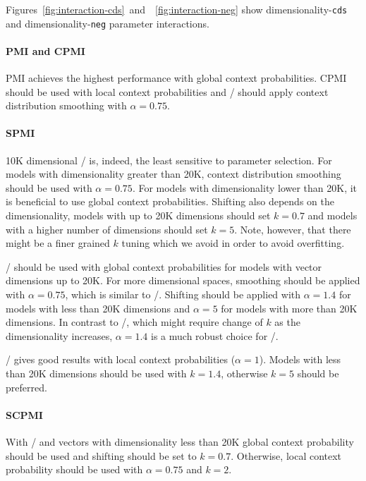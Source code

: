 \documentclass[11pt,letterpaper]{article}
\begin{document}


Figures~\ref{fig:interaction-cds}~and~~\ref{fig:interaction-neg} show dimensionality-\texttt{cds} and dimensionality-\texttt{neg} parameter interactions.

\paragraph{PMI and CPMI}

PMI achieves the highest performance with global context probabilities. CPMI should be used with local context probabilities and \CPMI/ should apply context distribution smoothing with $\alpha = 0.75$.

\paragraph{SPMI}

10K dimensional \SPMI/ is, indeed, the least sensitive to parameter selection. For models with dimensionality greater than 20K, context distribution smoothing should be used with $\alpha = 0.75$. For models with dimensionality lower than 20K, it is beneficial to use global context probabilities. Shifting also depends on the dimensionality, models with up to 20K dimensions should set $k = 0.7$ and models with a higher number of dimensions should set $k = 5$. Note, however, that there might be a finer grained $k$ tuning which we avoid in order to avoid overfitting.

\logNSPMI/ should be used with global context probabilities for models with vector dimensions up to 20K. For more dimensional spaces, smoothing should be applied with $\alpha = 0.75$, which is similar to \SPMI/. Shifting should be applied with $\alpha = 1.4$ for models with less than 20K dimensions and $\alpha = 5$ for models with more than 20K dimensions. In contrast to \SPMI/, which might require change of $k$ as the dimensionality increases, $\alpha = 1.4$ is a much robust choice for \logNSPMI/.

\NSPMI/ gives good results with local context probabilities ($\alpha = 1$). Models with less than 20K dimensions should be used with $k = 1.4$, otherwise $k = 5$ should be preferred.

\paragraph{SCPMI}

With \SCPMI/ and vectors with dimensionality less than 20K global context probability should be used and shifting should be set to $k = 0.7$. Otherwise, local context probability should be used with $\alpha = 0.75$ and $k = 2$.
\end{document}
